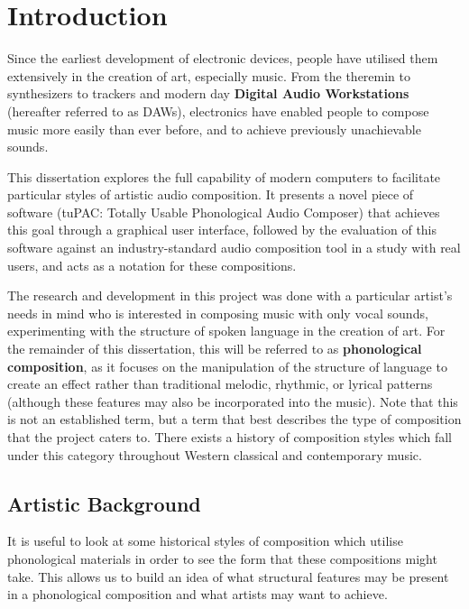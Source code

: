 \documentclass[12pt,a4paper,oneside,openright]{report}
\begin{document}

\pagestyle{headings}



\chapter{Introduction}
Since the earliest development of electronic devices, people have utilised them extensively in the creation of art, especially music. From the theremin to synthesizers to trackers and modern day \textbf{Digital Audio Workstations} (hereafter referred to as DAWs), electronics have enabled people to compose music more easily than ever before, and to achieve previously unachievable sounds.

This dissertation explores the full capability of modern computers to facilitate particular styles of artistic audio composition. It presents a novel piece of software (tuPAC: Totally Usable Phonological Audio Composer) that achieves this goal through a graphical user interface, followed by the evaluation of this software against an industry-standard audio composition tool in a study with real users, and acts as a notation for these compositions.
 
The research and development in this project was done with a particular artist's needs in mind who is interested in composing music with only vocal sounds, experimenting with the structure of spoken language in the creation of art. For the remainder of this dissertation, this will be referred to as \textbf{phonological composition}, as it focuses on the manipulation of the structure of language to create an effect rather than traditional melodic, rhythmic, or lyrical patterns (although these features may also be incorporated into the music). Note that this is not an established term, but a term that best describes the type of composition that the project caters to. There exists a history of composition styles which fall under this category throughout Western classical and contemporary music.

\section{Artistic Background}\label{sec:art_background}
It is useful to look at some historical styles of composition which utilise phonological materials in order to see the form that these compositions might take. This allows us to build an idea of what structural features may be present in a phonological composition and what artists may want to achieve.
\end{document}

